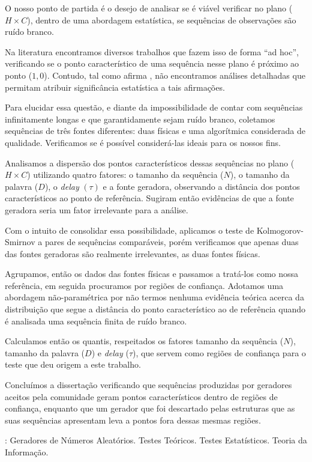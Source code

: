 \documentclass[tcc]{ic}
\begin{document}
\begin{resumo}
\noindent 

O nosso ponto de partida é o desejo de analisar
se é viável verificar no plano ($H\times C$), dentro de uma abordagem estatística, se sequências de observações são ruído branco.

Na literatura encontramos diversos trabalhos que fazem isso de forma ``ad hoc'', verificando se o ponto característico de uma sequência nesse plano é próximo ao ponto ($1,0$). 
Contudo, tal como afirma \citet{NewPermutationEntropy}, não encontramos análises detalhadas que permitam atribuir significância estatística a tais afirmações.

Para elucidar essa questão, e diante da impossibilidade de contar com sequências infinitamente longas e que garantidamente sejam ruído branco, coletamos sequências de três fontes diferentes: duas físicas e uma algorítmica considerada de qualidade.
Verificamos se é possível considerá-las ideais para os nossos fins.

Analisamos a dispersão dos pontos característicos dessas sequências no plano ($H\times C$) utilizando quatro fatores: o tamanho da sequência ($N$), o tamanho da palavra ($D$), o \textit{delay} $(\tau)$ e a fonte geradora, observando a distância dos pontos característicos ao ponto de referência. Sugiram então evidências de que a fonte geradora seria um fator irrelevante para a análise.

Com o intuito de consolidar essa possibilidade, aplicamos o teste de Kolmogorov-Smirnov a pares de sequências comparáveis, porém verificamos que apenas duas das fontes geradoras são realmente irrelevantes, as duas fontes físicas.

Agrupamos, então os dados das fontes físicas e passamos a tratá-los como nossa referência, em seguida procuramos por regiões de confiança. 
Adotamos uma abordagem não-paramétrica por não termos nenhuma evidência teórica acerca da distribuição que segue a distância do ponto característico ao de referência quando é analisada uma sequência finita de ruído branco.

Calculamos então os quantis, respeitados os fatores tamanho da sequência ($N$), tamanho da palavra ($D$) e \textit{delay} ($\tau$), que servem como regiões de confiança para o teste que deu origem a este trabalho.

Concluímos a dissertação verificando que sequências produzidas por geradores aceitos pela comunidade geram pontos característicos dentro de regiões de confiança, enquanto que um gerador que foi descartado pelas estruturas que as suas sequências apresentam leva a pontos fora dessas mesmas regiões.

\vspace{1em}
: Geradores de Números Aleatórios. Testes Teóricos. Testes Estatísticos. Teoria da Informação.
\end{resumo}
\end{document}

